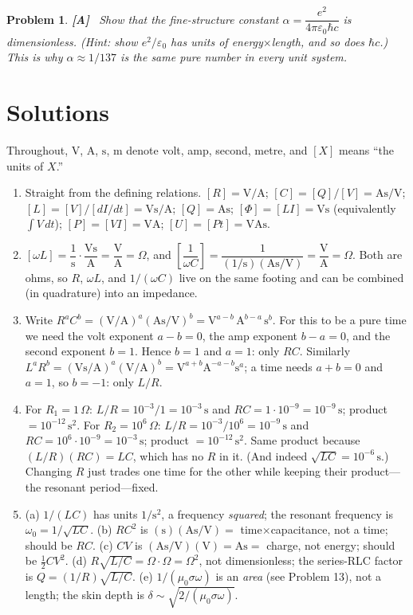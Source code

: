 \documentclass[11pt]{article}
\newcommand{\clearpts}{\addtocounter{tpts}{\value{cpts}} \setcounter{cpts}{0}}
\newcommand{\pts}[1]{\clearpts \setcounter{cpts}{#1}}
\newcommand{\advanced}{\!\textbf{\color{advblue}[A]\color{black}}\ }
\theoremstyle{mystyle}
\newtheorem{pproblem}{Problem}
\newcommand{\V}{\text{V}}
\newcommand{\A}{\text{A}}
\newcommand{\s}{\text{s}}
\newcommand{\m}{\text{m}}
\newcommand{\Ohm}{\Omega}
\begin{document}
\pts{5}
\begin{pproblem} \advanced
Show that the fine-structure constant $\alpha = \dfrac{e^2}{4\pi\varepsilon_0\hbar c}$
is dimensionless. (Hint: show $e^2/\varepsilon_0$ has units of energy$\times$length,
and so does $\hbar c$.) This is why $\alpha\approx 1/137$ is the same pure number in
every unit system.
\end{pproblem}

\newpage
\section{Solutions}

Throughout, $\V$, $\A$, $\s$, $\m$ denote volt, amp, second, metre, and
$[X]$ means ``the units of $X$.''

\begin{enumerate}

\item Straight from the defining relations.
$[R]=\V/\A$;\;
$[C]=[Q]/[V]=\A\s/\V$;\;
$[L]=[V]/[dI/dt]=\V\s/\A$;\;
$[Q]=\A\s$;\;
$[\Phi]=[LI]=\V\s$ (equivalently $\int V\,dt$);\;
$[P]=[VI]=\V\A$;\;
$[U]=[Pt]=\V\A\s$.

\item $[\omega L]=\dfrac{1}{\s}\cdot\dfrac{\V\s}{\A}=\dfrac{\V}{\A}=\Ohm$, and
$\left[\dfrac{1}{\omega C}\right]=\dfrac{1}{(1/\s)(\A\s/\V)}=\dfrac{\V}{\A}=\Ohm$.
Both are ohms, so $R$, $\omega L$, and $1/(\omega C)$ live on the same footing and can
be combined (in quadrature) into an impedance.

\item Write $R^aC^b=(\V/\A)^a(\A\s/\V)^b=\V^{a-b}\,\A^{b-a}\,\s^{b}$. For this to be a
pure time we need the volt exponent $a-b=0$, the amp exponent $b-a=0$, and the second
exponent $b=1$. Hence $b=1$ and $a=1$: only $RC$. Similarly
$L^aR^b=(\V\s/\A)^a(\V/\A)^b=\V^{a+b}\A^{-a-b}\s^{a}$; a time needs $a+b=0$ and $a=1$,
so $b=-1$: only $L/R$.

\item For $R_1=1\,\Omega$: $L/R=10^{-3}/1=10^{-3}\,\s$ and
$RC=1\cdot10^{-9}=10^{-9}\,\s$; product $=10^{-12}\,\s^2$.
For $R_2=10^{6}\,\Omega$: $L/R=10^{-3}/10^{6}=10^{-9}\,\s$ and
$RC=10^{6}\cdot10^{-9}=10^{-3}\,\s$; product $=10^{-12}\,\s^2$.
Same product because $(L/R)(RC)=LC$, which has no $R$ in it. (And indeed
$\sqrt{LC}=10^{-6}\,\s$.) Changing $R$ just trades one time for the other while keeping
their product---the resonant period---fixed.

\item
(a) $1/(LC)$ has units $1/\s^2$, a frequency \emph{squared}; the resonant frequency is
$\omega_0 = 1/\sqrt{LC}$.
(b) $RC^2$ is $(\s)(\A\s/\V)=$ time$\times$capacitance, not a time; should be $RC$.
(c) $CV$ is $(\A\s/\V)(\V)=\A\s=$ charge, not energy; should be $\tfrac12 CV^2$.
(d) $R\sqrt{L/C}=\Ohm\cdot\Ohm=\Ohm^2$, not dimensionless; the series-RLC factor is
$Q=(1/R)\sqrt{L/C}$.
(e) $1/(\mu_0\sigma\omega)$ is an \emph{area} (see Problem 13), not a length; the skin
depth is $\delta\sim\sqrt{2/(\mu_0\sigma\omega)}$.


\end{enumerate}
\end{document}
